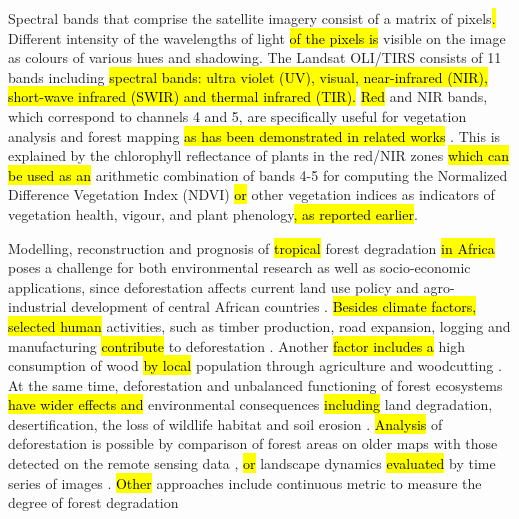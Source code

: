 \documentclass[applsci,article,submit,pdftex,moreauthors]{Definitions/mdpi}
\begin{document}
Spectral bands that comprise the satellite imagery\hl{ }consist\hl{ }of a matrix of pixels\hl{. }Different intensity of the wavelengths of light\hl{ of the pixels is }visible on the image as colours of various hues and shadowing. The Landsat OLI/TIRS consists of 11 bands including \hl{spectral bands: ultra violet (UV), visual, near-infrared (NIR), short-wave infrared (SWIR) and thermal infrared (TIR).} \hl{Red} and NIR bands, which correspond to channels 4 and 5, are specifically useful for vegetation analysis and forest mapping \hl{as has been demonstrated in related works} \cite{DALPONTE2020102206,HUANG2022100006,WANG2022113021}. This is explained by the chlorophyll reflectance of plants in the red/NIR zones\hl{ which can be used as an} arithmetic combination of bands 4-5\hl{ }for computing the Normalized Difference Vegetation Index (NDVI) \cite{HUETE2002195} \hl{or} other\hl{ }vegetation indices \cite{
JIANG20083833,HUETE1988295} as indicators of vegetation health, vigour, and plant phenology\hl{, as reported earlier}\cite{SOUDANI2012234,Lemenkova202019,1026428,HMIMINA2013145}.

Modelling, reconstruction and prognosis of \hl{tropical} forest degradation \hl{in Africa }poses a challenge for both environmental research\hl{ }as well as socio-economic applications, since deforestation affects\hl{ }current land use policy and agro-industrial development of central African countries \cite{TEGEGNE2016312,f13091508}. \hl{Besides climate factors, selected human} activities, such as timber production, road expansion, logging and manufacturing \hl{contribute} to deforestation \cite{BRANDT201615,TRITSCH2020106660,Lietal2015}. Another \hl{factor includes a} high consumption of wood \hl{ by local} population\hl{ }through agriculture and woodcutting \cite{Iloweka}. At the same time, deforestation and unbalanced functioning of forest ecosystems \hl{have wider effects and} environmental consequences\hl{ including} land degradation, desertification, the loss of wildlife habitat and soil erosion \cite{AQUILAS2022100553}. \hl{Analysis} of deforestation is possible by comparison of forest areas on older maps with those detected on the remote sensing data \cite{rs12040638,land10101042,Zhangetal2005},\hl{ or }landscape dynamics \hl{evaluated} by time series of images \cite{land11091541}. \hl{Other} approaches include continuous metric\hl{ }to measure the degree of forest degradation \cite{SHAPIRO2021107268}
 
\end{document}
